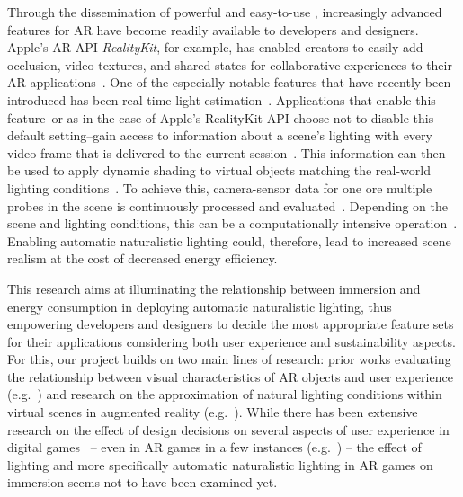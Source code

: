 \documentclass[12pt,twoside,english]{article}
\begin{document}
Through the dissemination of powerful and easy-to-use , increasingly advanced features for \gls{AR} have become readily available to developers and designers.
Apple's \gls{AR} \gls{API} \textit{RealityKit}, for example, has enabled creators to easily add occlusion, video textures, and shared states for collaborative experiences to their \gls{AR} applications~\cite{apple_realitykit_2020-1}.
One of the especially notable features that have recently been introduced has been real-time light estimation~\cite{apple_arlightestimate_2020}.
Applications that enable this feature--or as in the case of Apple's RealityKit \gls{API} choose not to disable this default setting--gain access to information about a scene's lighting with every video frame that is delivered to the current session~\cite{apple_arlightestimate_2020}.
This information can then be used to apply dynamic shading to virtual objects matching the real-world lighting conditions~\cite{apple_arlightestimate_2020}.
To achieve this, camera-sensor data for one ore multiple probes in the scene is continuously processed and evaluated~\cite{apple_arlightestimate_2020,apple_disablearenvironmentlighting_2020}.
Depending on the scene and lighting conditions, this can be a computationally intensive operation~\cite{steed_constructing_2016}.
Enabling automatic naturalistic lighting could, therefore, lead to increased scene realism at the cost of decreased energy efficiency.

This research aims at illuminating the relationship between immersion and energy consumption in deploying automatic naturalistic lighting, thus empowering developers and designers to decide the most appropriate feature sets for their applications considering both user experience and sustainability aspects.
For this, our project builds on two main lines of research: prior works evaluating the relationship between visual characteristics of \gls{AR} objects and user experience (e.g.~\cite{gabbard_effects_2006}) and research on the approximation of natural lighting conditions within virtual scenes in augmented reality (e.g.~\cite{aittala_inverse_2010}).
While there has been extensive research on the effect of design decisions on several aspects of user experience in digital games~\cite{johnson_validation_2018} -- even in \gls{AR} games in a few instances (e.g.~\cite{georgiou_development_2017}) -- the effect of lighting and more specifically automatic naturalistic lighting in \gls{AR} games on immersion seems not to have been examined yet.
\end{document}
